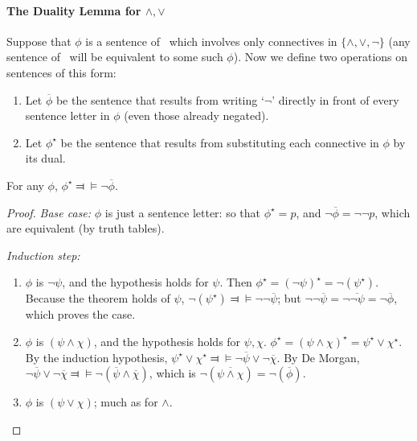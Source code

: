 \paragraph{The Duality Lemma for $\wedge,\vee$}

Suppose that $\phi$ is a sentence of \lone\ which involves only connectives in $\{\wedge,\vee,\neg\}$ (any sentence of \lone\ will be equivalent to some such $\phi$). Now we define two operations on sentences of this form: \begin{enumerate}
	\item Let $\overline{\phi}$ be the sentence that
	results from writing `$\neg$' directly in front of every sentence letter in
	$\phi$ (even those already negated).
	\item Let $\phi^{\star}$ be the sentence that results from substituting each connective in $\phi$ by its dual.
\end{enumerate}
\begin{lemma}
	For any $\phi$, $\phi^{\star}\Dashv\vDash\neg\overline{\phi}$. 
\begin{proof}
	\emph{Base case:}  $\phi$ is just a sentence
	letter: so that $\phi^{\star} = p$, and $\neg\overline{\phi} =
	\neg\neg p$, which are equivalent (by truth tables).

	\emph{Induction step:} \begin{enumerate}
		\item $\phi$ is $\neg \psi$, and the hypothesis holds for $\psi$. Then $\phi^{\star} = (\neg \psi)^{\star} = \neg
	    (\psi^{\star})$. Because the theorem holds of $\psi$, $\neg (\psi^{\star})
	    \Dashv\vDash \neg\neg\overline{\psi}$; but $\neg \neg\overline{\psi} =
	   \neg \overline{\neg\psi} = \neg\overline{\phi}$, which proves the
	   case.
	   	\item $\phi$ is $(\psi \wedge \chi)$, and the hypothesis holds for $\psi,\chi$. $\phi^{\star} = (\psi \wedge \chi)^{\star} = \psi^{\star} \vee
	   \chi^{\star}$. By the induction hypothesis, $\psi^{\star} \vee \chi^{\star}
	   \Dashv\vDash \neg\overline{\psi} \vee \neg \overline{\chi}$. By De
	   Morgan, $\neg\overline{\psi} \vee \neg \overline{\chi} \Dashv\vDash
	   \neg (\overline{\psi} \wedge \overline{\chi})$, which is
	   $\neg(\overline{\psi \wedge \chi}) =\neg(\overline{\phi})$.
		\item $\phi$ is $(\psi \vee \chi)$; much as for $\wedge$. 
	\end{enumerate}
\end{proof}\end{lemma}


